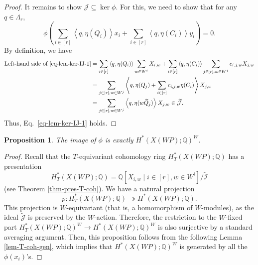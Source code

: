 \documentclass{amsart}
\newtheorem{proposition}[theorem]{Proposition}
\theoremstyle{definition}
\theoremstyle{remark}
\numberwithin{equation}{section}
\begin{document}
\begin{proof}
    It remains to show $\mathcal{J} \subseteq \ker \phi$.
    For this, we need to show that for any $q \in \Lambda_r$, 
    \begin{equation} \label{eq-lem-ker-IJ-1}
        \phi \left( \sum_{i\in [r]}\left\langle q, \eta(Q_i) \right\rangle x_i+\sum_{i\in [r]}\left\langle q, \eta(C_i) \right\rangle y_i \right) = 0.
    \end{equation}
    By definition, we have
    \begin{align*}
        \text{Left-hand side of } \eqref{eq-lem-ker-IJ-1} & = \sum_{i\in [r]} \left\langle q, \eta(Q_i) \right\rangle \sum_{w \in W^i} X_{i,w} + \sum_{i\in [r]} \left\langle q, \eta(C_i) \right\rangle \sum_{j \in [r], w \in W^j} c_{i,j,w} X_{j,w}\\
        & = \sum_{j \in [r], w \in W^j}  \left\langle q, \eta(Q_j) + \sum_{i\in [r]} c_{i,j,w} \eta(C_i) \right\rangle  X_{j,w} \\
        & = \sum_{j \in [r], w \in W^j} \left\langle q, \eta(w \widetilde{Q}_j) \right\rangle  X_{j,w} \in \widetilde{\mathcal{J}}.
    \end{align*}
    Thus, Eq.~\eqref{eq-lem-ker-IJ-1} holds.
\end{proof}

\begin{proposition} \label{lem-im=inv}
    The image of $\phi$ is exactly $H^*\left(X(\mathit{WP}) ; \mathbb{Q}\right)^W$.
\end{proposition}

\begin{proof}
    Recall that the $T$-equivariant cohomology ring $H^*_T\left(X(\mathit{WP}) ; \mathbb{Q}\right)$ has a presentation 
    \begin{equation*} 
      H^*_T\left(X(\mathit{WP}) ; \mathbb{Q}\right)=\mathbb{Q}\left[X_{i,w} \mid i \in [r], w \in W^i\right] / \widetilde{\mathcal{I}}
    \end{equation*}
    (see Theorem \ref{thm-pres-T-coh}).
    We have a natural projection 
    \[p : H^*_T\left(X(\mathit{WP}) ; \mathbb{Q}\right) \twoheadrightarrow H^*\left(X(\mathit{WP}) ; \mathbb{Q}\right).\]
    This projection is $W$-equivariant (that is, a homomorphism of $W$-modules), as the ideal $\widetilde{\mathcal{J}}$ is preserved by the $W$-action.
    Therefore, the restriction to the $W$-fixed part $H^*_T\left(X(\mathit{WP}) ; \mathbb{Q}\right)^W \to H^*\left(X(\mathit{WP}) ; \mathbb{Q}\right)^W$ is also surjective by a standard averaging argument.
    Then, this proposition follows from the following Lemma \ref{lem-T-coh-gen}, which implies that $H^*\left(X(\mathit{WP}) ; \mathbb{Q}\right)^W$ is generated by all the $\phi(x_i)$'s.
\end{proof}
\end{document}

